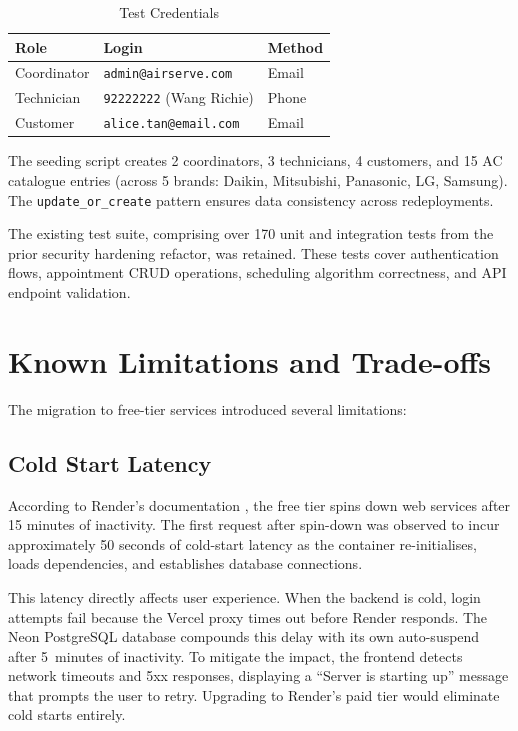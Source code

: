 \documentclass[conference]{IEEEtran}
\begin{document}
\begin{table}[H]
\centering
\caption{Test Credentials}
\label{tab:credentials}
\begin{tabular}{@{}lll@{}}
\toprule
\textbf{Role} & \textbf{Login} & \textbf{Method} \\
\midrule
Coordinator & \texttt{admin@airserve.com} & Email \\
Technician & \texttt{92222222} (Wang Richie) & Phone \\
Customer & \texttt{alice.tan@email.com} & Email \\
\bottomrule
\end{tabular}
\end{table}

The seeding script creates 2 coordinators, 3 technicians, 4 customers, and 15 AC catalogue entries (across 5 brands: Daikin, Mitsubishi, Panasonic, LG, Samsung). The \texttt{update\_or\_create} pattern ensures data consistency across redeployments.

The existing test suite, comprising over 170 unit and integration tests from the prior security hardening refactor, was retained. These tests cover authentication flows, appointment CRUD operations, scheduling algorithm correctness, and API endpoint validation.

\section{Known Limitations and Trade-offs}

The migration to free-tier services introduced several limitations:

\subsection{Cold Start Latency}

According to Render's documentation \cite{b2}, the free tier spins down web services after 15 minutes of inactivity. The first request after spin-down was observed to incur approximately 50 seconds of cold-start latency as the container re-initialises, loads dependencies, and establishes database connections.

This latency directly affects user experience. When the backend is cold, login attempts fail because the Vercel proxy times out before Render responds. The Neon PostgreSQL database compounds this delay with its own auto-suspend after 5~minutes of inactivity. To mitigate the impact, the frontend detects network timeouts and 5xx responses, displaying a ``Server is starting up'' message that prompts the user to retry. Upgrading to Render's paid tier would eliminate cold starts entirely.
\end{document}
